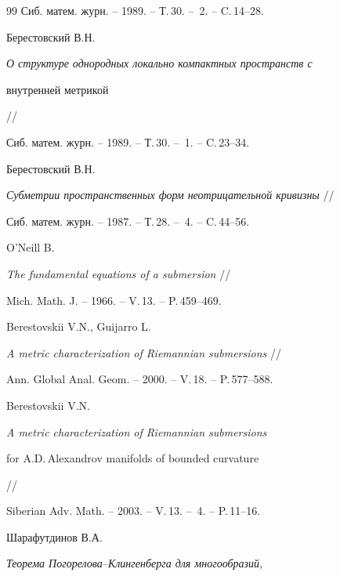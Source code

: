 \begin{thebibliography}{99}
 Сиб. матем. журн. -- 1989. -- Т.\,30. -- \No\,2. -- C.\,14--28.







Берестовский В.Н.


 {\em О структуре однородных локально компактных пространств с


внутренней метрикой} //


 Сиб. матем. журн. -- 1989. -- Т.\,30. -- \No\,1. -- C.\,23--34.







Берестовский В.Н.


 {\em Субметрии пространственных форм неотрицательной кривизны} //


 Сиб. матем. журн. -- 1987. -- Т.\,28. -- \No\,4. -- C.\,44--56.







O'Neill B.


 {\em The fundamental equations of a submersion} //


 Mich. Math. J. -- 1966. -- V.\,13. -- P.\,459--469.







Berestovskii V.N., Guijarro L.


 {\em A metric characterization of Riemannian submersions} //


 Ann. Global Anal. Geom. -- 2000. -- V.\,18. -- P.\,577--588.







Berestovskii V.N.


 {\em A metric characterization of Riemannian submersions


for A.D.\,Alexandrov manifolds of bounded curvature} //


 Siberian Adv. Math. -- 2003. -- V.\,13. -- \No\,4. -- P.\,11--16.







Шарафутдинов В.А.


 {\em Теорема Погорелова--Клингенберга для многообразий,


}
\end{thebibliography}

